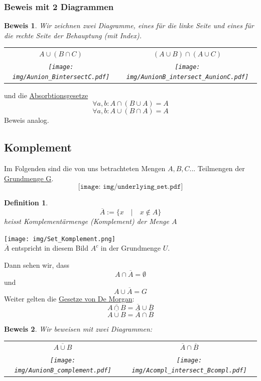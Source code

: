 \documentclass{report}
\newtheorem{mydef}{Definition}
\newtheorem{myproof}{Beweis}
\begin{document}
\subsubsection{Beweis mit 2 Diagrammen}
\begin{myproof}Wir zeichnen zwei Diagramme, eines für die linke Seite und eines für die rechte Seite der Behauptung (mit Index).
\begin{center}
\begin{tabular}{c c}
$A \cup (B \cap C)$ & $(A \cup B) \cap (A \cup C)$\\
\texttt{[image: img/Aunion\_BintersectC.pdf]} & \texttt{[image: img/AunionB\_intersect\_AunionC.pdf]}
\end{tabular}
\end{center}
\end{myproof}
und die \underline{Absorbtionsgesetze}
\begin{equation}\forall a,b : A \cap (B \cup A) = A\end{equation}
\begin{equation}\forall a,b : A \cup (B \cap A) = A\end{equation}
Beweis analog.
\subsection{Komplement}
Im Folgenden sind die von uns betrachteten Mengen $A, B, C$... Teilmengen der \underline{Grundmenge G}.
$$\texttt{[image: img/underlying\_set.pdf]}$$
\begin{mydef}\begin{equation}\overline{A} := \{x \quad | \quad x \not \in A\}\end{equation} heisst Komplementärmenge (Komplement) der Menge $A$\end{mydef}
\begin{center}\texttt{[image: img/Set\_Komplement.png]}\\$\overline{A}$ entspricht in diesem Bild $A^c$ in der Grundmenge $U$.\end{center}
Dann sehen wir, dass
\begin{equation}A \cap \overline{A} = \emptyset\end{equation}
und
\begin{equation}A \cup \overline{A} = G\end{equation}
Weiter gelten die \underline{Gesetze von De Morgan}:
\begin{equation}\overline{A \cap B} = \overline{A} \cup \overline{B}\end{equation}
\begin{equation}\overline{A \cup B} = \overline{A} \cap \overline{B}\end{equation}
\begin{myproof}Wir beweisen mit zwei Diagrammen:
\begin{center}\begin{tabular}{c c}
$\overline{A \cup B}$ & $\overline{A} \cap \overline{B}$\\
\texttt{[image: img/AunionB\_complement.pdf]} & \texttt{[image: img/Acompl\_intersect\_Bcompl.pdf]}
\end{tabular}
\end{center}\end{myproof}
\end{document}
